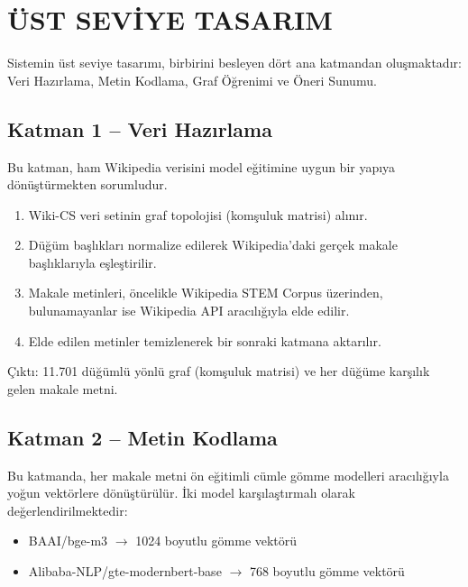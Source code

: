 \chapter{ÜST SEVİYE TASARIM}
\thispagestyle{empty}

Sistemin üst seviye tasarımı, birbirini besleyen dört ana katmandan oluşmaktadır: Veri Hazırlama, Metin Kodlama, Graf Öğrenimi ve Öneri Sunumu.


\section{Katman 1 -- Veri Hazırlama}

Bu katman, ham Wikipedia verisini model eğitimine uygun bir yapıya dönüştürmekten sorumludur.

\begin{enumerate}
    \item Wiki-CS veri setinin graf topolojisi (komşuluk matrisi) alınır.
    \item Düğüm başlıkları normalize edilerek Wikipedia'daki gerçek makale başlıklarıyla eşleştirilir.
    \item Makale metinleri, öncelikle Wikipedia STEM Corpus üzerinden, bulunamayanlar ise Wikipedia API aracılığıyla elde edilir.
    \item Elde edilen metinler temizlenerek bir sonraki katmana aktarılır.
\end{enumerate}

Çıktı: 11.701 düğümlü yönlü graf (komşuluk matrisi) ve her düğüme karşılık gelen makale metni.

\section{Katman 2 -- Metin Kodlama}

Bu katmanda, her makale metni ön eğitimli cümle gömme modelleri aracılığıyla yoğun vektörlere dönüştürülür. İki model karşılaştırmalı olarak değerlendirilmektedir:

\begin{itemize}
    \item BAAI/bge-m3 $\rightarrow$ 1024 boyutlu gömme vektörü
    \item Alibaba-NLP/gte-modernbert-base $\rightarrow$ 768 boyutlu gömme vektörü
\end{itemize}

